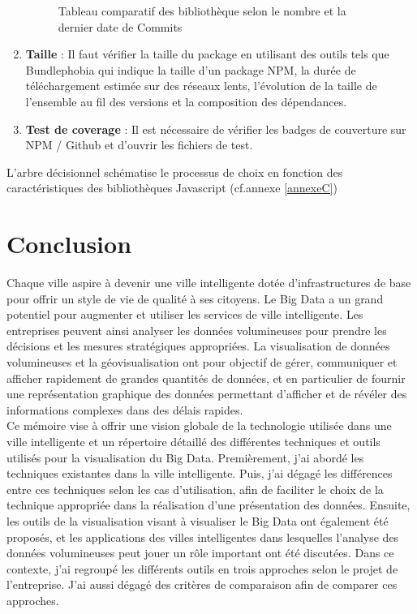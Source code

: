 \documentclass[french, a4paper, 12pt]{report}
\begin{document}
\begin{enumerate}
\begin{figure}[!ht]
    \caption{Tableau comparatif des bibliothèque selon le nombre et la dernier date de Commits }
    \label{fig:3.4}
\end{figure}
  \item \textbf{Taille} : Il faut vérifier la taille du package en utilisant des outils tels que Bundlephobia qui indique la taille d'un package NPM, la durée de téléchargement estimée sur des réseaux lents, l'évolution de la taille de l'ensemble au fil des versions et la composition des dépendances.
  \item \textbf{Test de coverage} : Il est nécessaire de vérifier les badges de couverture sur NPM / Github et d’ouvrir les fichiers de test.
\end{enumerate}
L’arbre décisionnel schématise le processus de choix en fonction des caractéristiques des bibliothèques Javascript (cf.annexe \ref{annexeC})



\chapter{Conclusion}
Chaque ville aspire à devenir une ville intelligente dotée d'infrastructures de base pour offrir un style de vie de qualité à ses citoyens. Le Big Data a un grand potentiel pour augmenter et utiliser les services de ville intelligente. Les entreprises peuvent ainsi analyser les données volumineuses pour prendre les décisions et les mesures stratégiques appropriées. La visualisation de données volumineuses et la géovisualisation ont pour objectif de gérer, communiquer et afficher rapidement de grandes quantités de données, et en particulier de fournir une représentation graphique des données permettant d'afficher et de révéler des informations complexes dans des délais rapides. \\

 Ce mémoire vise à offrir une vision globale de la technologie utilisée dans une ville intelligente et un répertoire détaillé des différentes techniques et outils utilisés pour la visualisation du Big Data. Premièrement, j’ai abordé les techniques existantes dans la ville intelligente. Puis, j’ai dégagé les différences entre ces techniques selon les cas d’utilisation, afin de faciliter le choix de la technique appropriée dans la réalisation d’une présentation des données. Ensuite, les outils de la visualisation visant à visualiser le Big Data ont également été proposés, et les applications des villes intelligentes dans lesquelles l'analyse des données volumineuses peut jouer un rôle important ont été discutées. Dans ce contexte, j’ai regroupé les différents outils en trois approches selon le projet de l’entreprise. J’ai aussi dégagé des critères de comparaison afin de comparer ces approches. \\
 
\end{document}
